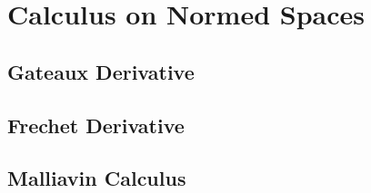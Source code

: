 \chapter{Calculus on Normed Spaces}
    \section{Gateaux Derivative}
    \section{Frechet Derivative}
    \section{Malliavin Calculus}